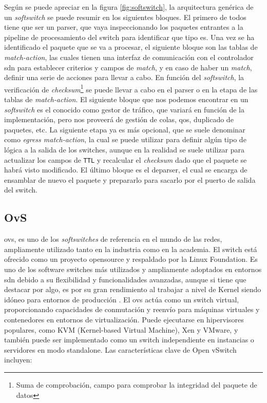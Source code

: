 Según se puede apreciar en la figura \ref{fig:softswitch}, la arquitectura genérica de un \textit{softswitch} se puede resumir en los siguientes bloques. El primero de todos tiene que ser un parser, que vaya inspeccionando los paquetes entrantes a la pipeline de procesamiento del switch para identificar que tipo es. Una vez se ha identificado el paquete que se va a procesar, el siguiente bloque son las tablas de \textit{match-action}, las cuales tienen una interfaz de comunicación con el controlador \gls{sdn} para establecer criterios y campos de \textit{match}, y en caso de haber un \textit{match}, definir una serie de acciones para llevar a cabo. En función del \textit{softswitch}, la verificación de \textit{checksum}\footnote{Suma de comprobación, campo para comprobar la integridad del paquete de datos} se puede llevar a cabo en el parser o en la etapa de las tablas de \textit{match-action}. El siguiente bloque que nos podemos encontrar en un \textit{softswitch} es el conocido como gestor de tráfico, que variará en función de la implementación, pero nos proveerá de gestión de colas, \gls{qos}, duplicado de paquetes, etc. La siguiente etapa ya es más opcional, que se suele denominar como \textit{egress match-action}, la cual se puede utilizar para definir algún tipo de lógica a la salida de los switches, aunque en la realidad se suele utilizar para actualizar los campos  de \texttt{TTL} y recalcular el \textit{checksum} dado que el paquete se habrá visto modificado. El último bloque es el deparser, el cual se encarga de ensamblar de nuevo el paquete y prepararlo para sacarlo por el puerto de salida del switch.

\subsection{OvS}
\label{subsec:OVS}

\gls{ovs}, es uno de los \textit{softswitches} de referencia en el mundo de las redes, ampliamente utilizado tanto en la industria como en la academia. El switch está ofrecido como un proyecto opensource y respaldado por la Linux Foundation.  Es uno de los software switches más utilizados y ampliamente adoptados en entornos \gls{sdn} debido a su flexibilidad y funcionalidades avanzadas, aunque si tiene que destacar por algo, es por su gran rendimiento al trabajar a nivel de Kernel siendo idóneo para entornos de producción \cite{ovs1}. El \gls{ovs} actúa como un switch virtual, proporcionando capacidades de conmutación y reenvío para máquinas virtuales y contenedores en entornos de virtualización. Puede ejecutarse en hipervisores populares, como KVM (Kernel-based Virtual Machine), Xen y VMware, y también puede ser implementado como un switch independiente en instancias o servidores en modo standalone. Las características clave de Open vSwitch incluyen:

